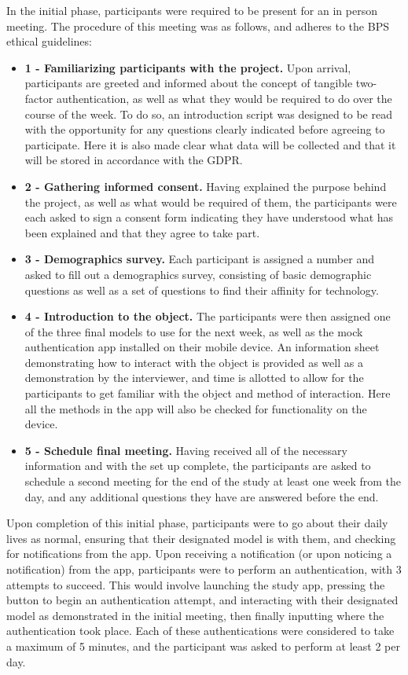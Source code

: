 \documentclass{l4proj}
\begin{document}
In the initial phase, participants were required to be present for an in person meeting. The procedure of this meeting was as follows, and adheres to the BPS ethical guidelines:
\begin{itemize}
    \item  \textbf{1 - Familiarizing participants with the project.} Upon arrival, participants are greeted and informed about the concept of tangible two-factor authentication, as well as what they would be required to do over the course of the week. To do so, an introduction script was designed to be read with the opportunity for any questions clearly indicated before agreeing to participate. Here it is also made clear what data will be collected and that it will be stored in accordance with the GDPR.
    \item \textbf{2 - Gathering informed consent.} Having explained the purpose behind the project, as well as what would be required of them, the participants were each asked to sign a consent form indicating they have understood what has been explained and that they agree to take part.
    \item \textbf{3 - Demographics survey.} Each participant is assigned a number and asked to fill out a demographics survey, consisting of basic demographic questions as well as a set of questions to find their affinity for technology.
    \item \textbf{4 - Introduction to the object.} The participants were then assigned one of the three final models to use for the next week, as well as the mock authentication app installed on their mobile device. An information sheet demonstrating how to interact with the object is provided as well as a demonstration by the interviewer, and time is allotted to allow for the participants to get familiar with the object and method of interaction. Here all the methods in the app will also be checked for functionality on the device.
    \item \textbf{5 - Schedule final meeting.} Having received all of the necessary information and with the set up complete, the participants are asked to schedule a second meeting for the end of the study at least one week from the day, and any additional questions they have are answered before the end.
\end{itemize}

Upon completion of this initial phase, participants were to go about their daily lives as normal, ensuring that their designated model is with them, and checking for notifications from the app. Upon receiving a notification (or upon noticing a notification) from the app, participants were to perform an authentication, with 3 attempts to succeed. This would involve launching the study app, pressing the button to begin an authentication attempt, and interacting with their designated model as demonstrated in the initial meeting, then finally inputting where the authentication took place. Each of these authentications were considered to take a maximum of 5 minutes, and the participant was asked to perform at least 2 per day. 
\end{document}

